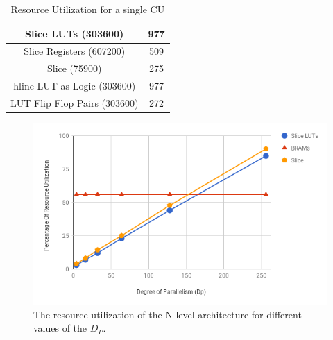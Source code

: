 \begin{table}[t!]
\caption{Resource Utilization for a single CU}
\begin{center}
\begin{tabular}{ |c|c| }
  \hline
    Slice LUTs (303600) & 977 \\	\hline
    Slice Registers (607200) & 509\\	\hline
    Slice (75900) & 275	\\hline
    LUT as Logic (303600)& 977\\	\hline
    LUT Flip Flop Pairs (303600) & 272\\
  \hline
\end{tabular}

  \label{tab:2}
\end{center}
\end{table}

\begin{figure}[t!]
\begin{center}
\includegraphics[clip,width=1\linewidth]{Fig/Chart.png}
\caption{The resource utilization of the N-level architecture for different values of the $D_P$. }
\label{fig:ResourceUtil}
\end{center}
\end{figure}



